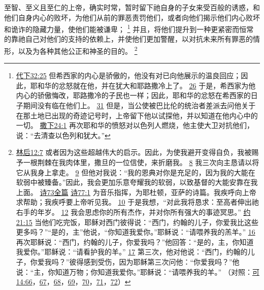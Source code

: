 \documentclass[12pt, a4paper, oneside]{ctexart}
\newcounter{parnum}[section]
\newcommand{\N}{%
   \noindent\refstepcounter{parnum}%
    \makebox[\parindent][l]{\textbf{\arabic{parnum}.}}}
\begin{document}
\N 至智、至义且至仁的上帝，确实时常，暂时留下祂自身的子女来受百般的诱惑，和他们自身内心的败坏，为他们从前的罪恶责罚他们，或者向他们揭示他们内心败坏和诡诈的隐藏力量，使他们能被谦卑；
	\footnote {
		\href{https://biblehub.com/2_chronicles/32-25.htm}{代下32:25} 但希西家的内心是骄傲的，他没有对已向他展示的温良回应；因此，耶和华的忿怒就在他，并在犹大和耶路撒冷上了。
		\href{https://biblehub.com/2_chronicles/32-26.htm}{26} 于是，希西家为他内心的骄傲悔改，耶路撒冷的子民也一样；因此，耶和华的忿怒在希西家的日子期间没有临在他们上。
		\href{https://biblehub.com/2_chronicles/32-31.htm}{31} 但是，当公使被巴比伦的统治者差派去问他关于在那土地已出现的奇迹记号时，上帝留下他以试探他，并以知道在他内心中的一切。
		\href{https://biblehub.com/2_samuel/24-1.htm}{撒下24:1} 再次耶和华的愤怒对以色列人燃烧，他主使大卫对抗他们，说：“去清查以色列和犹大。”
	}
	并且，将他们提升到一种更紧密而恒常的靠祂自己对他们的支持的依赖上，并使他们更加警醒，以对抗未来所有罪恶的情形，以及为各种其他公正和神圣的目的。
	\footnote {
		\href{https://biblehub.com/2_corinthians/12-7.htm}{林后12:7} 或者因为这些超越伟大的启示。因此，为使我避开变得自负，我被赐予一根荆棘在我肉体里，撒旦的一位信使，来折磨我。
		\href{https://biblehub.com/2_corinthians/12-8.htm}{8} 我三次向主恳请以将它从我身上拿走。
		\href{https://biblehub.com/2_corinthians/12-9.htm}{9} 但他对我说：“我的恩典对你是充足的，因为我的大能在软弱中被臻备。”因此，我会更加乐意夸耀我的软弱，以致基督的大能安靠在我上面。
		\href{https://biblehub.com/niv/psalms/73.htm}{诗73全篇}
		\href{https://biblehub.com/psalms/77-1.htm}{诗77:1} 为音乐指挥，为耶杜顿，亚萨的诗篇。我疾呼向上帝求帮助；我疾呼要上帝听见我。
		\href{https://biblehub.com/psalms/77-10.htm}{10} 于是我想，“对此我将恳求：至高者伸出祂右手的年岁。
		\href{https://biblehub.com/psalms/77-12.htm}{12} 我会思虑你的所有杰作，并对你所有强大的事迹冥思。”
		\href{https://biblehub.com/john/21-15.htm}{约21:15} 当他们吃完饭，耶稣对西门彼得说：“西门，约翰的儿子，你爱我比这些更多吗？”“是的，主”他说，“你知道我爱你。”耶稣说：“请喂养我的羔羊。”
		\href{https://biblehub.com/john/21-16.htm}{16} 再次耶稣说：“西门，约翰的儿子，你爱我吗？”他回答：“是的，主，你知道我爱你。”耶稣说：“请看护我的羊。”
		\href{https://biblehub.com/john/21-17.htm}{17} 第三次，他对他说：“西门，约翰的儿子，你爱我吗？”彼得感到受伤，因为耶稣第三次问他：“你爱我吗？”他说：“主，你知道万物；你知道我爱你。”耶稣说：“请喂养我的羊。”
		 （对照：\href{https://biblehub.com/mark/14-66.htm}{可14:66}，\href{https://biblehub.com/mark/14-67.htm}{67}，\href{https://biblehub.com/mark/14-68.htm}{68}，\href{https://biblehub.com/mark/14-69.htm}{69}，\href{https://biblehub.com/mark/14-70.htm}{70}，\href{https://biblehub.com/mark/14-71.htm}{71}，\href{https://biblehub.com/mark/14-72.htm}{72}）
	}
\end{document}
